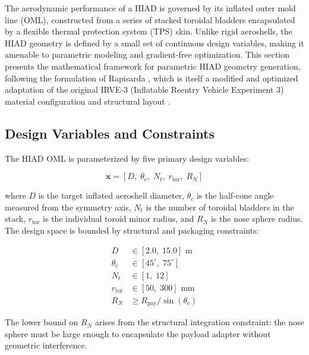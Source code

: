 The aerodynamic performance of a HIAD is governed by its inflated outer mold line (OML), constructed from a series of stacked toroidal bladders encapsulated by a flexible thermal protection system (TPS) skin. Unlike rigid aeroshells, the HIAD geometry is defined by a small set of continuous design variables, making it amenable to parametric modeling and gradient-free optimization. This section presents the mathematical framework for parametric HIAD geometry generation, following the formulation of Rapisarda \cite{rapisarda2023mdao}, which is itself a modified and optimized adaptation of the original IRVE-3 (Inflatable Reentry Vehicle Experiment 3) material configuration and structural layout \cite{dillman2015irve3, old2013irve3postflight}.

\subsection{Design Variables and Constraints}

The HIAD OML is parameterized by five primary design variables:

\begin{equation}
    \mathbf{x} = \left[ D,\; \theta_c,\; N_t,\; r_{\text{tor}},\; R_N \right]
    \label{eq:hiad_design_variables}
\end{equation}

\noindent where $D$ is the target inflated aeroshell diameter, $\theta_c$ is the half-cone angle measured from the symmetry axis, $N_t$ is the number of toroidal bladders in the stack, $r_{\text{tor}}$ is the individual toroid minor radius, and $R_N$ is the nose sphere radius. The design space is bounded by structural and packaging constraints:

\begin{equation}
    \begin{aligned}
        D &\in [2.0,\; 15.0] \text{ m} \\
        \theta_c &\in [45^\circ,\; 75^\circ] \\
        N_t &\in [1,\; 12] \\
        r_{\text{tor}} &\in [50,\; 300] \text{ mm} \\
        R_N &\geq R_{\text{pay}} / \sin(\theta_c)
    \end{aligned}
    \label{eq:design_bounds}
\end{equation}

\noindent The lower bound on $R_N$ arises from the structural integration constraint: the nose sphere must be large enough to encapsulate the payload adapter without geometric interference.

